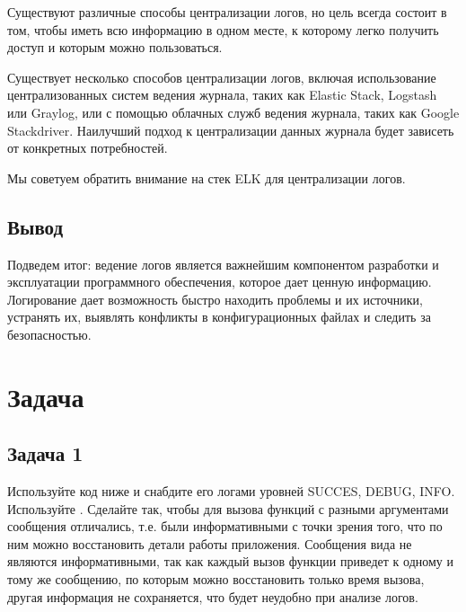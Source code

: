 \documentclass[letterpaper,10pt,russian]{sphinxmanual}
\begin{document}
\sphinxAtStartPar
Существуют различные способы централизации логов, но цель всегда состоит в том, чтобы иметь всю информацию в одном месте, к которому легко получить доступ и которым можно пользоваться.

\sphinxAtStartPar
Существует несколько способов централизации логов, включая использование централизованных систем ведения журнала, таких как Elastic Stack, Logstash или Graylog, или с помощью облачных служб ведения журнала, таких как Google Stackdriver. Наилучший подход к централизации данных журнала будет зависеть от конкретных потребностей.

\sphinxAtStartPar
Мы советуем обратить внимание на стек ELK для централизации логов.


\subsection{Вывод}
\label{\detokenize{educational_materials/logging/content:id7}}
\sphinxAtStartPar
Подведем итог: ведение логов является важнейшим компонентом разработки и эксплуатации программного обеспечения, которое дает ценную информацию. Логирование дает возможность быстро находить проблемы и их источники, устранять их, выявлять конфликты в конфигурационных файлах и следить за безопасностью.

\sphinxstepscope


\section{Задача}
\label{\detokenize{educational_materials/logging/exercises:id1}}\label{\detokenize{educational_materials/logging/exercises::doc}}

\subsection{Задача 1}
\label{\detokenize{educational_materials/logging/exercises:id2}}
\sphinxAtStartPar
Используйте код ниже и снабдите его логами уровней SUCCES, DEBUG, INFO. Используйте . Сделайте так, чтобы для вызова функций с разными аргументами сообщения отличались, т.е. были информативными с точки зрения того, что по ним можно восстановить детали работы приложения. Сообщения вида  не являются информативными, так как каждый вызов функции приведет к одному и тому же сообщению, по которым можно восстановить только время вызова, другая информация не сохраняется, что будет неудобно при анализе логов.
\end{document}
